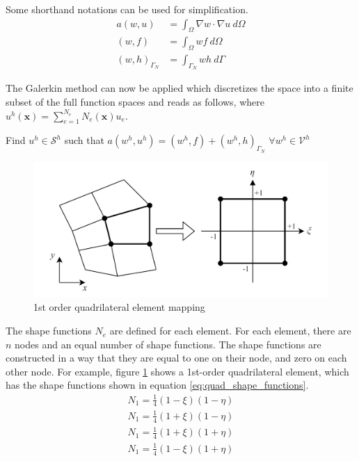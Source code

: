 Some shorthand notations can be used for simplification.
\begin{equation}
	\begin{split}
		a(w,u) &= \int_\Omega \nabla w \cdot \nabla u \ d\Omega \\
		(w,f) &= \int_\Omega w f \ d\Omega \\
		(w,h)_{\Gamma_N} & = \int_{\Gamma_N} wh \ d\Gamma
	\end{split}
	\label{eq:bilinear_forms}
\end{equation}

The Galerkin method can now be applied which discretizes the space into a finite subset of the full function spaces and reads as follows, where $u^h(\mathbf x)=\sum_{e=1}^{N_e}N_e(\mathbf x)u_e$. 

Find $u^h\in\mathcal{S}^h$ such that $a(w^h,u^h) = (w^h,f) + (w^h,h)_{\Gamma_N}$    $\forall w^h\in\mathcal{V}^h$

\begin{figure}[t]
	\centering
	\includegraphics[width=0.75\linewidth]{figures/chapter_2/QuadElement.png}
	\caption{1st order quadrilateral element mapping}
	\label{fig:quad_element}
\end{figure}
The shape functions $N_e$ are defined for each element. For each element, there are $n$ nodes and an equal number of shape functions. The shape functions are constructed in a way that they are equal to one on their node, and zero on each other node. For example, figure \ref{fig:quad_element} shows a 1st-order quadrilateral element, which has the shape functions shown in equation \ref{eq:quad_shape_functions}.
\begin{equation}
	\begin{split}
		N_1 = \frac{1}{4}(1-\xi)(1-\eta) \\
		N_1 = \frac{1}{4}(1+\xi)(1-\eta) \\
		N_1 = \frac{1}{4}(1+\xi)(1+\eta) \\
		N_1 = \frac{1}{4}(1-\xi)(1+\eta)
	\end{split}
	\label{eq:quad_shape_functions}
\end{equation}

